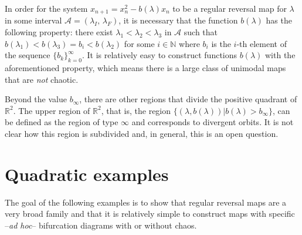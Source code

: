 \documentclass[10pt,twoside,titlepage]{book}
\numberwithin{equation}{chapter}
\numberwithin{figure}{chapter}
\numberwithin{table}{chapter}
\theoremstyle{plain}%
\theoremstyle{definition}
\theoremstyle{remark}
\begin{document}
In order for the system $x_{n+1}=x_{n}^{2}-b(\lambda)x_{n}$ to be a regular reversal map for $\lambda$ in some interval $\mathcal{A}=(\lambda_I,\,\lambda_F)$, it is necessary that the function $b(\lambda)$ has the following property: there exist $\lambda_{1}<\lambda_{2}<\lambda_{3}$ in $\mathcal{A}$ such that $b(\lambda_{1})<b(\lambda_{3})=b_{i}<b(\lambda_{2})$ for some $i\in\mathbb{N}$ where $b_{i}$ is the $i$-th element of the sequence $\{b_{k}\}_{k=0}^{\infty}$. It is relatively easy to construct functions $b(\lambda)$ with the aforementioned property, which means there is a large class of unimodal maps that are \emph{not} chaotic.

Beyond the value $b_{\infty}$, there are other regions that divide the positive quadrant of $\mathbb{R}^{2}$. The upper region of $\mathbb{R}^{2}$, that is, the region $\{(\lambda,b(\lambda))\vert b(\lambda)>b_{\infty}\}$, can be defined as the region of type $\infty$ and corresponds to divergent orbits. It is not clear how this region is subdivided and, in general, this is an open question.

\section{Quadratic examples}

The goal of the following examples is to show that regular reversal maps are a very broad family and that it is relatively simple to construct maps with specific --\emph{ad
	hoc}-- bifurcation diagrams  with or without chaos.
\end{document}
